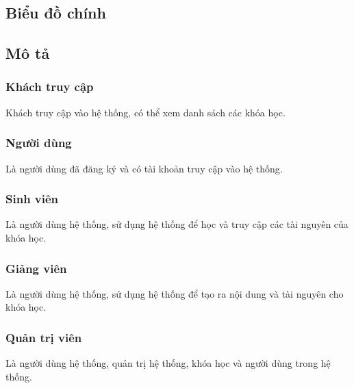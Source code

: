 \documentclass[./../main_file.tex]{subfiles}
\begin{document}
\subsection{Biểu đồ chính}

\begin{figure}[h!]
	\centering
	\resizebox{1.2\textwidth}{!}{}
\end{figure}

\subsection{Mô tả}
	\subsubsection{Khách truy cập}
	Khách truy cập vào hệ thống, có thể xem danh sách các khóa học.
	
	\subsubsection{Người dùng}
	Là người dùng đã đăng ký và có tài khoản truy cập vào hệ thống.
	
	\subsubsection{Sinh viên}
	Là người dùng hệ thống, sử dụng hệ thống để học và truy cập các tài nguyên của khóa học.
	
	\subsubsection{Giảng viên}
	Là người dùng hệ thống, sử dụng hệ thống để tạo ra nội dung và tài nguyên cho khóa học.
	
	\subsubsection{Quản trị viên}
	Là người dùng hệ thống, quản trị hệ thống, khóa học và người dùng trong hệ thống.
	
	
\end{document}

